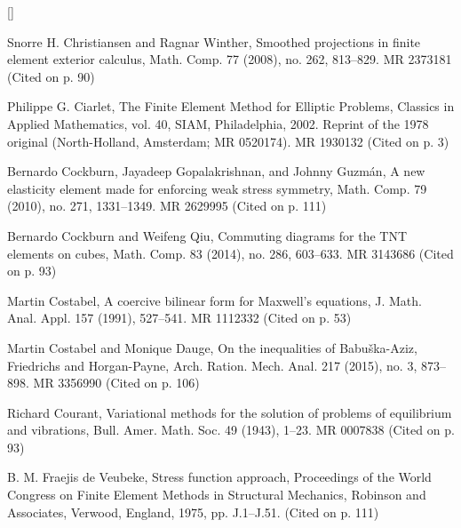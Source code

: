 \begin{list}{[]}{\setlength{\leftmargin}{2.7em}\setlength{\labelwidth}{2.2em}}
\item\label{bib:source-30}Snorre H. Christiansen and Ragnar Winther, Smoothed projections in finite element exterior calculus, Math. Comp. 77 (2008), no. 262, 813–829. MR 2373181 (Cited on p. 90)

\item\label{bib:source-31}Philippe G. Ciarlet, The Finite Element Method for Elliptic Problems, Classics in Applied Mathematics, vol. 40, SIAM, Philadelphia, 2002. Reprint of the 1978 original (North-Holland, Amsterdam; MR 0520174). MR 1930132 (Cited on p. 3)

\item\label{bib:source-32}Bernardo Cockburn, Jayadeep Gopalakrishnan, and Johnny Guzmán, A new elasticity element made for enforcing weak stress symmetry, Math. Comp. 79 (2010), no. 271, 1331–1349. MR 2629995 (Cited on p. 111)

\item\label{bib:source-33}Bernardo Cockburn and Weifeng Qiu, Commuting diagrams for the TNT elements on cubes, Math. Comp. 83 (2014), no. 286, 603–633. MR 3143686 (Cited on p. 93)

\item\label{bib:source-34}Martin Costabel, A coercive bilinear form for Maxwell’s equations, J. Math. Anal. Appl. 157 (1991), 527–541. MR 1112332 (Cited on p. 53)

\item\label{bib:source-35}Martin Costabel and Monique Dauge, On the inequalities of Babuška-Aziz, Friedrichs and Horgan-Payne, Arch. Ration. Mech. Anal. 217 (2015), no. 3, 873– 898. MR 3356990 (Cited on p. 106)

\item\label{bib:source-36}Richard Courant, Variational methods for the solution of problems of equilibrium and vibrations, Bull. Amer. Math. Soc. 49 (1943), 1–23. MR 0007838 (Cited on p. 93)

\item\label{bib:source-37}B. M. Fraejis de Veubeke, Stress function approach, Proceedings of the World Congress on Finite Element Methods in Structural Mechanics, Robinson and Associates, Verwood, England, 1975, pp. J.1–J.51. (Cited on p. 111)


\end{list}
